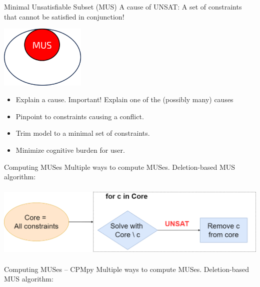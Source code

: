 \documentclass{cons-beamer}
\begin{document}
\begin{frame}{Minimal Unsatisfiable Subset (MUS)}
  A cause of UNSAT: A set of constraints that cannot be satisfied in conjunction! 

  \begin{center}
    \includegraphics[height=30mm]{images/texpl_img/mus.png}

    \begin{itemize}
      \item Explain a cause. \alert{Important! Explain one of the (possibly many) causes}
      \item Pinpoint to constraints causing a conflict.
      \item Trim model to a minimal set of constraints.
      \item Minimize cognitive burden for user.
    \end{itemize}      
  \end{center}
\end{frame}

\begin{frame}{Computing MUSes}
  Multiple ways to compute MUSes. Deletion-based MUS algorithm:
  \vfill

  \begin{center}
    \includegraphics[height=35mm]{images/texpl_img/mus_naive_diagram.png}
  \end{center}
\end{frame}

\begin{flashcardcpmpy}
\begin{frame}{Computing MUSes -- CPMpy}
  Multiple ways to compute MUSes. Deletion-based MUS algorithm:

  \begin{example}
    \footnotesize
  \end{example}
\end{frame}
\end{flashcardcpmpy}
\end{document}
